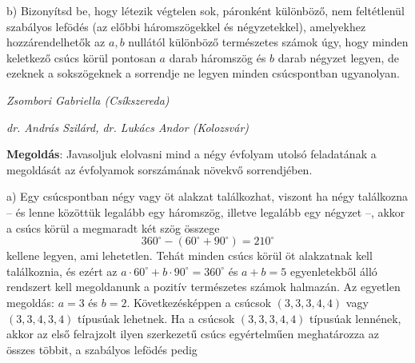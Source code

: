 \documentclass[a4paper,10pt]{article}
\newcommand{\ki}[2]{\hfill {\it #1 (#2)}\medskip}
\begin{document}
b) Bizonyítsd be, hogy létezik végtelen sok, páronként
különböző, nem feltétlenül sza\-bá\-lyos lefödés
(az előbbi háromszögekkel és négyzetekkel), amelyekhez
hozzárendelhetők az $a,b$ nullától különböző
termé\-sze\-tes számok úgy, hogy minden keletkező csúcs
körül pontosan $a$ darab háromszög és $b$ darab négyzet
legyen, de ezeknek a sokszögeknek a sorrendje ne legyen minden
csúcspontban ugyanolyan.


\ki{Zsombori Gabriella}{Csíkszereda}


\ki{dr. András Szilárd, dr. Lukács Andor}{Kolozsvár}

{\bf Megoldás}: Javasoljuk elolvasni mind a négy évfolyam utolsó feladatának
a megoldását az évfolyamok sorszámának nö\-vek\-vő
sorrendjében.

a) Egy csúcspontban négy vagy öt alakzat találkozhat,
viszont ha négy találkozna  -- és lenne közöttük
legalább egy háromszög, illetve legalább egy négyzet --,
akkor a csúcs körül a megmaradt két szög összege
    \[
        360^\circ - (60^\circ  + 90^\circ) = 210^\circ
    \]
    kellene legyen, ami lehetetlen. Tehát minden csúcs körül öt alak\-zat\-nak
    kell találkoznia, és ezért az $a\cdot 60^\circ + b\cdot 90^\circ = 360^\circ$ és $a + b = 5$
    egyenletekből álló rendszert kell megoldanunk a pozitív természetes számok
    halmazán. Az egyetlen megoldás: $a=3$ és $b=2$. Következésképpen a csúcsok
    $(3,3,3,4,4)$ vagy $(3,3,4,3,4)$ típusúak lehetnek.
    Ha a csúcsok $(3,3,3,4,4)$ típusúak lennének, akkor az első fel\-raj\-zolt
    ilyen szerkezetű csúcs egyértelműen meg\-ha\-tá\-roz\-za az összes többit, a szabályos lefödés pedig
\end{document}
